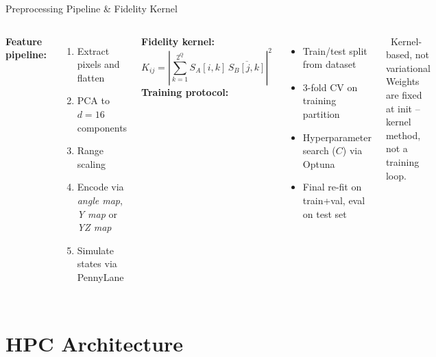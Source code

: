 \documentclass[10pt, aspectratio=169]{beamer}
\begin{document}
\begin{frame}{Preprocessing Pipeline \& Fidelity Kernel}
    \begin{columns}[T,onlytextwidth]
        \textbf{Feature pipeline:}
        \begin{enumerate}
            \item Extract pixels and flatten
            \item PCA to $d=16$ components
            \item Range scaling
            \item Encode via \textit{angle map}, \textit{Y map} or \textit{YZ map}
            \item Simulate states via PennyLane
        \end{enumerate}
        \vspace{0.2cm}
        \textbf{Fidelity kernel:}
        \[K_{ij} = \left|\sum_{k=1}^{2^Q} S_A[i,k]\,\overline{S_B[j,k]}\right|^2\]
        \textbf{Training protocol:}
        \begin{itemize}
            \item Train/test split from dataset
            \item 3-fold CV on training partition
            \item Hyperparameter search ($C$) via Optuna
            \item Final re-fit on train+val, eval on test set
        \end{itemize}
        \vspace{0.2cm}
        \begin{alertblock}{\faInfoCircle\ Kernel-based, not variational}
            Weights are fixed at init -- kernel method, not a training loop.
        \end{alertblock}
    \end{columns}
\end{frame}

\section{HPC Architecture}
\end{document}
